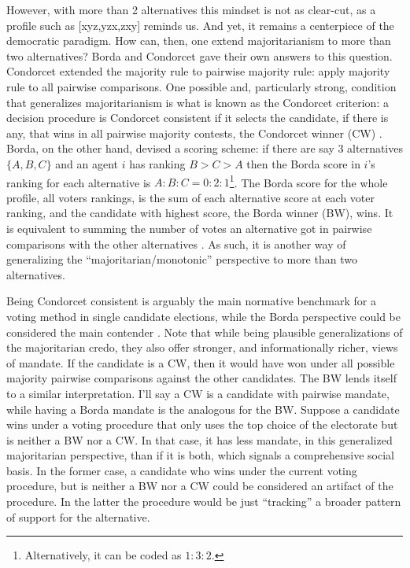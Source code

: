 \documentclass[hidelinks,11pt]{article}
\begin{document}
However, with more than 2 alternatives this mindset is not as clear-cut, as a
profile such as [xyz,yzx,zxy] reminds us. And yet, it remains a centerpiece of
the democratic paradigm. How can, then, one extend majoritarianism to more than
two alternatives? Borda and Condorcet gave their own answers to this question.
Condorcet extended the majority rule to pairwise majority rule: apply majority
rule to all pairwise comparisons. One possible and, particularly strong,
condition that generalizes majoritarianism is what is known as the Condorcet
criterion: a decision procedure is Condorcet consistent if it selects the
candidate, if there is any, that wins in all pairwise majority contests, the
Condorcet winner (CW) \parencite{Felsenthal_1992}. Borda, on the other hand,
devised a scoring scheme: if there are say 3 alternatives \(\{A,B,C\}\) and an
agent \(i\) has ranking \(B>C>A\) then the Borda score in \(i\)'s ranking for
each alternative is \(A:B:C = 0:2:1\)\footnote{Alternatively, it can be coded as
  \(1:3:2\).}. The Borda score for the whole profile, all voters rankings, is
the sum of each alternative score at each voter ranking, and the candidate with
highest score, the Borda winner (BW), wins. It is equivalent to summing the
number of votes an alternative got in pairwise comparisons with the other
alternatives \parencite{nurmi1999voting}. As such, it is another way of
generalizing the ``majoritarian/monotonic'' perspective to more than two
alternatives.

Being Condorcet consistent is arguably the main normative benchmark for a voting
method in single candidate elections, while the Borda perspective could be
considered the main contender \parencite{regenwetter2006behavioral,
  felsenthal2011review}. Note that while being plausible generalizations of the
majoritarian credo, they also offer stronger, and informationally richer, views
of mandate. If the candidate is a CW, then it would have won under all possible
majority pairwise comparisons against the other candidates. The BW lends itself
to a similar interpretation. I'll say a CW is a candidate with pairwise mandate,
while having a Borda mandate is the analogous for the BW. Suppose a candidate
wins under a voting procedure that only uses the top choice of the electorate
but is neither a BW nor a CW. In that case, it has less mandate, in this
generalized majoritarian perspective, than if it is both, which signals a
comprehensive social basis. In the former case, a candidate who wins under the
current voting procedure, but is neither a BW nor a CW could be considered an
artifact of the procedure. In the latter the procedure would be just
``tracking'' a broader pattern of support for the alternative.
\end{document}
